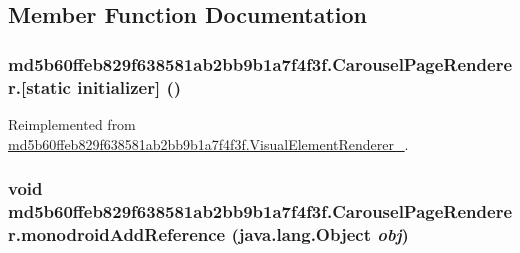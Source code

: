 \subsection{Member Function Documentation}
\hypertarget{classmd5b60ffeb829f638581ab2bb9b1a7f4f3f_1_1_carousel_page_renderer_b87f2babc1d49821ed9e8214e2e04691}{
\subsubsection[{[static initializer]}]{\setlength{\rightskip}{0pt plus 5cm}md5b60ffeb829f638581ab2bb9b1a7f4f3f.CarouselPageRenderer.\mbox{[}static initializer\mbox{]} ()}}
\label{classmd5b60ffeb829f638581ab2bb9b1a7f4f3f_1_1_carousel_page_renderer_b87f2babc1d49821ed9e8214e2e04691}




Reimplemented from \hyperlink{classmd5b60ffeb829f638581ab2bb9b1a7f4f3f_1_1_visual_element_renderer__1_3ae26bd8575212fb6d6f14487b4f48d4}{md5b60ffeb829f638581ab2bb9b1a7f4f3f.VisualElementRenderer\_}.\hypertarget{classmd5b60ffeb829f638581ab2bb9b1a7f4f3f_1_1_carousel_page_renderer_3887bda40516040ce44ded44b90eed5a}{
\subsubsection[{monodroidAddReference}]{\setlength{\rightskip}{0pt plus 5cm}void md5b60ffeb829f638581ab2bb9b1a7f4f3f.CarouselPageRenderer.monodroidAddReference (java.lang.Object {\em obj})}}
\label{classmd5b60ffeb829f638581ab2bb9b1a7f4f3f_1_1_carousel_page_renderer_3887bda40516040ce44ded44b90eed5a}




